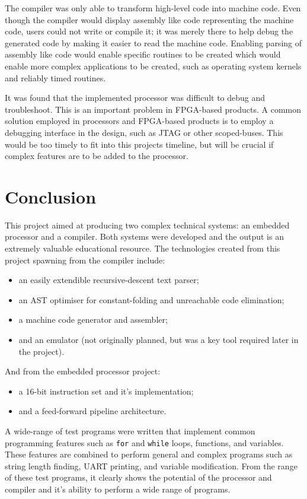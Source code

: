 \documentclass[11pt,a4paper]{report}
\begin{document}
The compiler was only able to transform high-level code into machine code. Even though the compiler would display assembly like code representing the machine code, users could not write or compile it; it was merely there to help debug the generated code by making it easier to read the machine code. Enabling parsing of assembly like code would enable specific routines to be created which would enable more complex applications to be created, such as operating system kernels and reliably timed routines.

It was found that the implemented processor was difficult to debug and troubleshoot. This is an important problem in FPGA-based products. A common solution employed in processors and FPGA-based products is to employ a debugging interface in the design, such as JTAG or other scoped-buses. This would be too timely to fit into this projects timeline, but will be crucial if complex features are to be added to the processor.

\newpage
\section{Conclusion}
This project aimed at producing two complex technical systems: an embedded processor and a compiler. Both systems were developed and the output is an extremely valuable educational resource. The technologies created from this project spawning from the compiler include:
\begin{itemize}
\item{an easily extendible recursive-descent text parser;}
\item{an AST optimiser for constant-folding and unreachable code elimination;}
\item{a machine code generator and assembler;}
\item{and an emulator (not originally planned, but was a key tool required later in the project).}
\end{itemize}
And from the embedded processor project:
\begin{itemize}
\item{a 16-bit instruction set and it's implementation;}
\item{and a feed-forward pipeline architecture.}
\end{itemize}

A wide-range of test programs were written that implement common programming features such as \verb|for| and \verb|while| loops, functions, and variables. These features are combined to perform general and complex programs such as string length finding, UART printing, and variable modification. From the range of these test programs, it clearly shows the potential of the processor and compiler and it's ability to perform a wide range of programs. 
\end{document}
